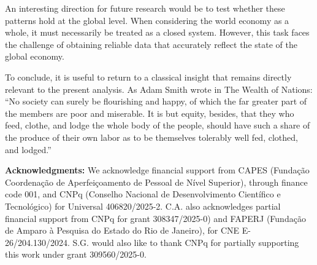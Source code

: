 \documentclass[12pt]{article}
\begin{document}
An interesting direction for future research would be to  test whether these patterns hold at the global level. When considering the world economy as a whole, it must necessarily be treated as a closed system. However, this task faces the challenge of obtaining reliable data that accurately reflect the state of the global economy.

To conclude, it is useful to return to a classical insight that remains directly relevant to the present analysis. As Adam Smith wrote in The Wealth of Nations:
``No society can surely be flourishing and happy, of which the far greater part of the members are poor and miserable. It is but equity, besides, that they who feed, clothe, and lodge the whole body of the people, should have such a share of the produce of their own labor as to be themselves tolerably well fed, clothed, and lodged.''~\cite{smith1776wealth} 

 

{\bf Acknowledgments:}
We acknowledge financial support from CAPES (Fundação Coordenação de Aperfeiçoamento de Pessoal de Nível Superior), through finance code 001, 
and CNPq (Conselho Nacional de Desenvolvimento Científico e Tecnológico) for Universal 406820/2025-2. 
C.A. also acknowledges partial financial support from CNPq for grant 308347/2025-0) and FAPERJ (Fundação de Amparo à Pesquisa do Estado do Rio de Janeiro), for CNE E-26/204.130/2024. S.G. would also like to thank CNPq for partially supporting this work under grant 309560/2025-0.

%
%




 
\end{document}
